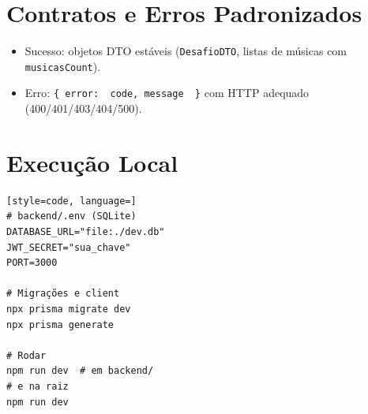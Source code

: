 \documentclass[12pt,a4paper]{article}
\begin{document}
\section{Contratos e Erros Padronizados}
\begin{itemize}
  \item Sucesso: objetos DTO estáveis (\texttt{DesafioDTO}, listas de músicas com \texttt{musicasCount}).
  \item Erro: \texttt{\{ error: { code, message } \}} com HTTP adequado (400/401/403/404/500).
\end{itemize}

\section{Execução Local}
\begin{lstlisting}[style=code, language=]
# backend/.env (SQLite)
DATABASE_URL="file:./dev.db"
JWT_SECRET="sua_chave"
PORT=3000

# Migrações e client
npx prisma migrate dev
npx prisma generate

# Rodar
npm run dev  # em backend/
# e na raiz
npm run dev
\end{lstlisting}
\end{document}
